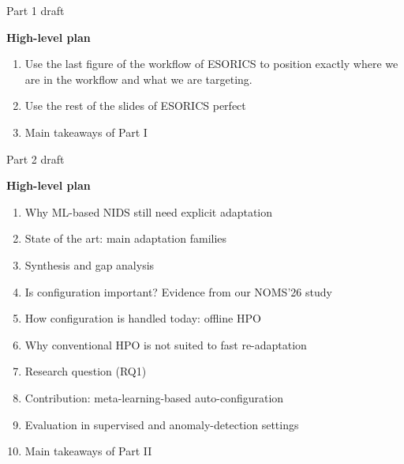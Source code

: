 

\begin{frame}{Part 1 draft}
	\small

	\textbf{High-level plan}

	\begin{enumerate}
		\item Use the last figure of the workflow of ESORICS to position exactly where we are in the workflow and what we are targeting.
		\item Use the rest of the slides of ESORICS perfect
		\item Main takeaways of Part I

	\end{enumerate}
\end{frame}



\begin{frame}{Part 2 draft}
	\small

	\textbf{High-level plan}

	\begin{enumerate}
		\item Why ML-based NIDS still need explicit adaptation
		\item State of the art: main adaptation families
		\item Synthesis and gap analysis
		\item Is configuration important? Evidence from our NOMS'26 study
		\item How configuration is handled today: offline HPO
		\item Why conventional HPO is not suited to fast re-adaptation
		\item Research question (RQ1)
		\item Contribution: meta-learning-based auto-configuration
		\item Evaluation in supervised and anomaly-detection settings
		\item Main takeaways of Part II
	\end{enumerate}
\end{frame}
